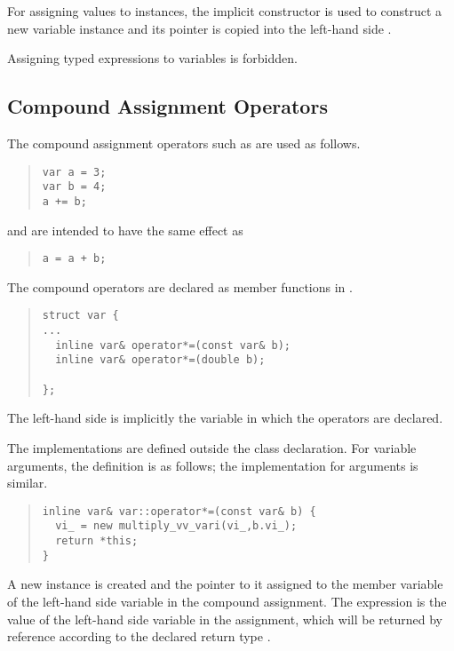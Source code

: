 \documentclass[10pt]{article}
\begin{document}
For assigning  values to  instances, the
implicit constructor  is used to construct a new
variable instance and its  pointer is copied into the
left-hand side .  

Assigning  typed expressions to  variables is
forbidden.  

\subsection{Compound Assignment Operators}

The compound assignment operators such as \code{+=} are used as
follows.
%
\begin{quote}
\begin{Verbatim}
var a = 3;
var b = 4;
a += b;
\end{Verbatim}
\end{quote}
%
and are intended to have the same effect as
%
\begin{quote}
\begin{Verbatim}
a = a + b;
\end{Verbatim}
\end{quote}
%
The compound operators are declared as member functions in .
%
\begin{quote}
\begin{Verbatim}
struct var {
...
  inline var& operator*=(const var& b);
  inline var& operator*=(double b);

};
\end{Verbatim}
\end{quote}
%
The left-hand side is implicitly the variable in which the operators
are declared.

The implementations are defined outside the class declaration.  For variable
arguments, the definition is as follows; the implementation for
 arguments is similar.
%
\begin{quote}
\begin{Verbatim}
inline var& var::operator*=(const var& b) {
  vi_ = new multiply_vv_vari(vi_,b.vi_);
  return *this;
}
\end{Verbatim}
\end{quote}
%
A new  instance is created and the pointer to
it assigned to the member variable  of the left-hand side
variable in the compound assignment.  The expression  is
the value of the left-hand side variable in the assignment, which will
be returned by reference according to the declared return type
.
\end{document}
